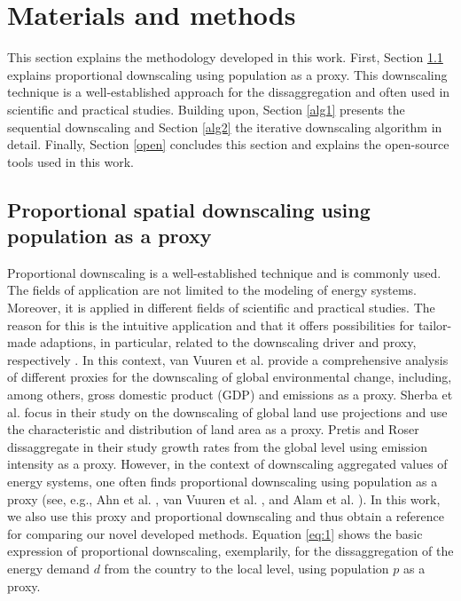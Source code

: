 \section{Materials and methods}\label{methodology}
This section explains the methodology developed in this work. First, Section \ref{pop} explains proportional downscaling using population as a proxy. This downscaling technique is a well-established approach for the dissaggregation and often used in scientific and practical studies. Building upon, Section \ref{alg1} presents the sequential downscaling and Section \ref{alg2} the iterative downscaling algorithm in detail. Finally, Section \ref{open} concludes this section and explains the open-source tools used in this work.

\subsection{Proportional spatial downscaling using population as a proxy}\label{pop}
Proportional downscaling is a well-established technique and is commonly used. The fields of application are not limited to the modeling of energy systems. Moreover, it is applied in different fields of scientific and practical studies. The reason for this is the intuitive application and that it offers possibilities for tailor-made adaptions, in particular, related to the downscaling driver and proxy, respectively \cite{van2006downscaling}. In this context, van Vuuren et al. \cite{van2006downscaling} provide a comprehensive analysis of different proxies for the downscaling of global environmental change, including, among others, gross domestic product (GDP) and emissions as a proxy. Sherba et al. \cite{sherba2015downscaling} focus in their study on the downscaling of global land use projections and use the characteristic and distribution of land area as a proxy. Pretis and Roser \cite{pretis2017carbon} dissaggregate in their study growth rates from the global level using emission intensity as a proxy. However, in the context of downscaling aggregated values of energy systems, one often finds proportional downscaling using population as a proxy (see, e.g., Ahn et al. \cite{ahn2019downscaled}, van Vuuren et al. \cite{van2010downscaling}, and Alam et al. \cite{alam2018downscaling}). In this work, we also use this proxy and proportional downscaling and thus obtain a reference for comparing our novel developed methods. Equation \ref{eq:1} shows the basic expression of proportional downscaling, exemplarily, for the dissaggregation of the energy demand $d$ from the country to the local level, using population $p$ as a proxy. 

